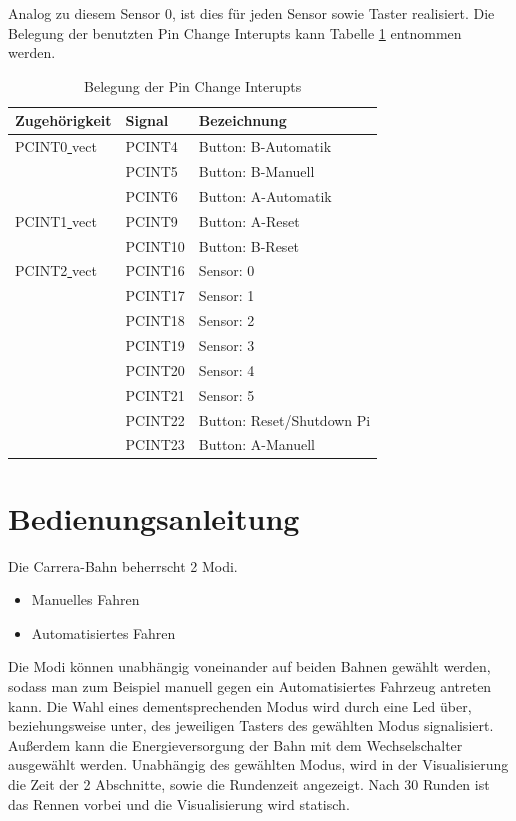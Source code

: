 \documentclass[a4paper, 11pt]{scrartcl}
\begin{document}
			Analog zu diesem Sensor 0, ist dies für jeden Sensor sowie Taster realisiert. Die Belegung der benutzten Pin Change Interupts kann Tabelle \ref{tab:belegungpcint} entnommen werden.
			\begin{table}[h]
				\begin{tabular}{|l|l|l|}
					\hline 
					Zugehörigkeit & Signal & Bezeichnung\\
					\hline
					\hline
					PCINT0\underline{ }vect & PCINT4 & Button: B-Automatik\\
					\hline
											& PCINT5 & Button: B-Manuell\\
					\hline
											& PCINT6 & Button: A-Automatik\\
					\hline
					\hline
					PCINT1\underline{ }vect & PCINT9 & Button: A-Reset\\
					\hline
											& PCINT10 & Button: B-Reset\\
					\hline
					\hline
					PCINT2\underline{ }vect & PCINT16 & Sensor: 0\\
					\hline
											& PCINT17 & Sensor: 1\\
					\hline
											& PCINT18 & Sensor: 2\\
					\hline
											& PCINT19 & Sensor: 3\\
					\hline
											& PCINT20 & Sensor: 4\\
					\hline
											& PCINT21 & Sensor: 5\\
					\hline
											& PCINT22 & Button: Reset/Shutdown Pi\\
					\hline
											& PCINT23 & Button: A-Manuell\\
					\hline
				\end{tabular}
				\caption{Belegung der Pin Change Interupts}
				\label{tab:belegungpcint}
			\end{table}
			
	\newpage
	
\section{Bedienungsanleitung}
		Die Carrera-Bahn beherrscht 2 Modi.
		\begin{itemize}
			\item Manuelles Fahren
			\item Automatisiertes Fahren
		\end{itemize}
		Die Modi können unabhängig voneinander auf beiden Bahnen gewählt werden, sodass man zum Beispiel manuell 
		gegen ein Automatisiertes Fahrzeug antreten kann.
		Die Wahl eines dementsprechenden Modus wird durch eine Led über, beziehungsweise unter, des jeweiligen 
		Tasters des gewählten Modus signalisiert. 
		Außerdem kann die Energieversorgung der Bahn mit dem Wechselschalter ausgewählt werden.
		Unabhängig des gewählten Modus, wird in der Visualisierung die Zeit der 2 Abschnitte, sowie die 
		Rundenzeit angezeigt. Nach 30 Runden ist das Rennen vorbei und die Visualisierung wird statisch.
\end{document}
